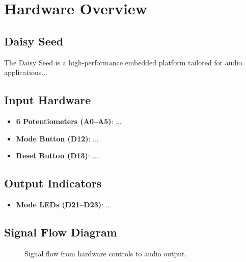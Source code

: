 \section{Hardware Overview}

\subsection{Daisy Seed}
The Daisy Seed is a high-performance embedded platform tailored for audio applications...

\subsection{Input Hardware}
\begin{itemize}
  \item \textbf{6 Potentiometers (A0–A5)}: ...
  \item \textbf{Mode Button (D12)}: ...
  \item \textbf{Reset Button (D13)}: ...
\end{itemize}

\subsection{Output Indicators}
\begin{itemize}
  \item \textbf{Mode LEDs (D21–D23)}: ...
\end{itemize}

\subsection{Signal Flow Diagram}
\begin{figure}[H]
  \centering
  
  \caption{Signal flow from hardware controls to audio output.}
\end{figure}
